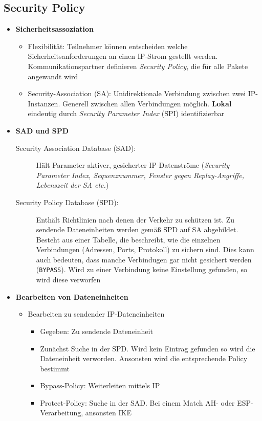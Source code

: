 \subsection{Security Policy}
\begin{itemize}
	\item \textbf{Sicherheitsassoziation}
	\begin{itemize}
		\item Flexibilität: Teilnehmer können entscheiden welche Sicherheitsanforderungen an einen IP-Strom gestellt werden. Kommunikationspartner definieren \textit{Security Policy}, die für alle Pakete angewandt wird
		\item Security-Association (SA): Unidirektionale Verbindung zwischen zwei IP-Instanzen. Generell zwischen allen Verbindungen möglich. \textbf{Lokal} eindeutig durch \textit{Security Parameter Index} (SPI) identifizierbar
	\end{itemize}
	\item \textbf{SAD und SPD}
	\begin{description}
		\item[Security Association Database (SAD):] Hält Parameter aktiver, gesicherter IP-Datenströme (\textit{Security Parameter Index, Sequenznummer, Fenster gegen Replay-Angriffe, Lebenszeit der SA etc.})
		\item[Security Policy Database (SPD):] Enthält Richtlinien nach denen der Verkehr zu schützen ist. Zu sendende Dateneinheiten werden gemäß SPD auf SA abgebildet. Besteht aus einer Tabelle, die beschreibt, wie die einzelnen Verbindungen (Adressen, Ports, Protokoll) zu sichern sind. Dies kann auch bedeuten, dass manche Verbindugen gar nicht gesichert werden (\texttt{BYPASS}). Wird zu einer Verbindung keine Einstellung gefunden, so wird diese verworfen
	\end{description}
	\item \textbf{Bearbeiten von Dateneinheiten}
	\begin{itemize}
		\item Bearbeiten zu sendender IP-Dateneinheiten
		\begin{itemize}
			\item Gegeben: Zu sendende Dateneinheit
			\item Zunächst Suche in der SPD. Wird kein Eintrag gefunden so wird die Dateneinheit verworden. Ansonsten wird die entsprechende Policy bestimmt
			\item Bypass-Policy: Weiterleiten mittels IP
			\item Protect-Policy: Suche in der SAD. Bei einem Match AH- oder ESP-Verarbeitung, ansonsten IKE

\end{itemize}
\end{itemize}
\end{itemize}
